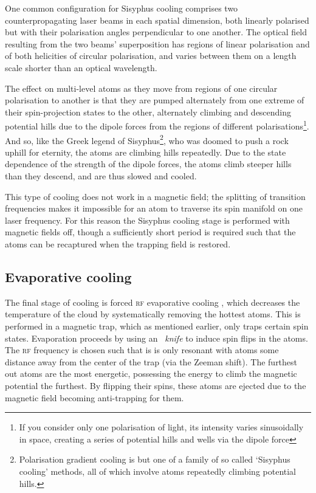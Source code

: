 One common configuration for Sisyphus cooling comprises two counterpropagating laser beams in each spatial dimension, both linearly polarised but with their polarisation angles perpendicular to one another. The optical field resulting from the two beams' superposition has regions of linear polarisation and of both helicities of circular polarisation, and varies between them on a length scale shorter than an optical wavelength.

The effect on multi-level atoms as they move from regions of one circular polarisation to another is that they are pumped alternately from one extreme of their spin-projection states to the other, alternately climbing and descending potential hills due to the dipole forces from the regions of different polarisations\footnote{If you consider only one polarisation of light, its intensity varies sinusoidally in space, creating a series of potential hills and wells via the dipole force}. And so, like the Greek legend of Sisyphus\footnote{Polarisation gradient cooling is but one of a family of so called `Sisyphus cooling' methods, all of which involve atoms repeatedly climbing potential hills.}, who was doomed to push a rock uphill for eternity, the atoms are climbing hills repeatedly. Due to the state dependence of the strength of the dipole forces, the atoms climb steeper hills than they descend, and are thus slowed and cooled.

This type of cooling does not work in a magnetic field; the splitting of transition frequencies makes it impossible for an atom to traverse its spin manifold on one laser frequency. For this reason the Sisyphus cooling stage is performed with magnetic fields off, though a sufficiently short period is required such that the atoms can be recaptured when the trapping field is restored.

\subsection{Evaporative cooling}

The final stage of cooling is forced \textsc{rf} evaporative cooling \cite{hess_evaporative_1986, anderson_observation_1995}, which decreases the temperature of the cloud by systematically removing the hottest atoms. This is performed in a magnetic trap, which as mentioned earlier, only traps certain spin states. Evaporation proceeds by using an \emph{\rf\ knife} to induce spin flips in the atoms. The \textsc{rf} frequency is chosen such that is is only resonant with atoms some distance away from the center of the trap (via the Zeeman shift). The furthest out atoms are the most energetic, possessing the energy to climb the magnetic potential the furthest. By flipping their spins, these atoms are ejected due to the magnetic field becoming anti-trapping for them.

